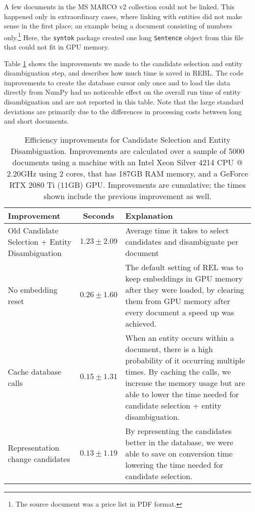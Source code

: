 A few documents in the MS MARCO v2 collection could not be linked. This happened only in extraordinary cases, where linking with entities did not make sense in the first place; an example being a document consisting of numbers only.\footnote{The source document was a price list in PDF format.} Here, the \texttt{syntok} package created one long \texttt{Sentence} object from this file that could not fit in GPU memory.

Table \ref{tab:efficiency} shows the improvements we made to the candidate selection and entity disambiguation step, and describes how much time is saved in REBL. The code improvements to create the database cursor only once and to load the data directly from NumPy had no noticeable effect on the overall run time of entity disambiguation and are not reported in this table. Note that the large standard deviations are primarily due to the differences in processing costs between long and short documents.

\begin{table}
	\caption{Efficiency improvements for Candidate Selection and Entity Disambiguation. Improvements are calculated over a sample of 5000 documents using a machine with an Intel Xeon Silver 4214 CPU @ 2.20GHz using 2 cores, that has 187GB RAM memory, and a GeForce RTX 2080 Ti (11GB) GPU. Improvements are cumulative; the times shown include the previous improvement as well.}
	\label{tab:efficiency}
	\begin{tabular}{p{4cm} c p{5cm}}
		\toprule
		Improvement & Seconds & Explanation\\
		\midrule
		Old Candidate Selection + Entity Disambiguation & $1.23 \pm 2.09$ & Average time it takes to select candidates and disambiguate per document\\
		\midrule
		No embedding reset & $0.26 \pm 1.60$ & The default setting of REL was to keep embeddings in GPU memory after they were loaded, by clearing them from GPU memory after every document a speed up was achieved.\\
		Cache database calls & $0.15 \pm 1.31$ & When an entity occurs within a document, there is a high probability of it occurring multiple times. By caching the calls, we increase the memory usage but are able to lower the time needed for candidate selection + entity disambiguation.  \\
		Representation change candidates & $0.13 \pm 1.19$ & By representing the candidates better in the database, we were able to save on conversion time lowering the time needed for candidate selection.\\
		\bottomrule
	\end{tabular}
\end{table}


